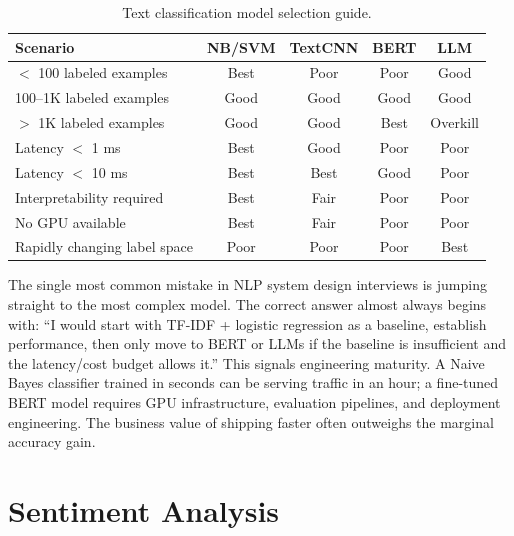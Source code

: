 \begin{table}[H]
\centering
\caption{Text classification model selection guide.}
\label{tab:text_clf_selection}
\begin{tabular}{@{}lcccc@{}}
\toprule
\textbf{Scenario} & \textbf{NB/SVM} & \textbf{TextCNN} & \textbf{BERT} & \textbf{LLM} \\
\midrule
$<$ 100 labeled examples       & Best     & Poor   & Poor   & Good   \\
100--1K labeled examples       & Good     & Good   & Good   & Good   \\
$>$ 1K labeled examples        & Good     & Good   & Best   & Overkill \\
Latency $<$ 1 ms               & Best     & Good   & Poor   & Poor   \\
Latency $<$ 10 ms              & Best     & Best   & Good   & Poor   \\
Interpretability required      & Best     & Fair   & Poor   & Poor   \\
No GPU available               & Best     & Fair   & Poor   & Poor   \\
Rapidly changing label space   & Poor     & Poor   & Poor   & Best   \\
\bottomrule
\end{tabular}
\end{table}

\begin{keyinsight}
The single most common mistake in NLP system design interviews is jumping straight to the most
complex model.  The correct answer almost always begins with: ``I would start with TF-IDF +
logistic regression as a baseline, establish performance, then only move to BERT or LLMs if the
baseline is insufficient and the latency/cost budget allows it.''  This signals engineering
maturity.  A Naive Bayes classifier trained in seconds can be serving traffic in an hour;
a fine-tuned BERT model requires GPU infrastructure, evaluation pipelines, and deployment
engineering.  The business value of shipping faster often outweighs the marginal accuracy gain.
\end{keyinsight}

\section{Sentiment Analysis}
\label{sec:sentiment_analysis}

